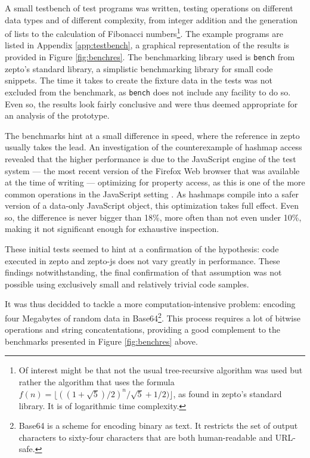 \documentclass[oneside,11pt,xetex]{scrbook}
\begin{document}
A small testbench of test programs was written, testing operations on
different data types and of different complexity, from integer addition and
the generation of lists to the calculation of Fibonacci numbers\footnote{Of interest
might be that not the usual tree-recursive algorithm was used but rather the
algorithm that uses the formula \(f(n) = \lfloor{((1 + \sqrt{5}) / 2)^n / \sqrt{5} + 1/2)}\rfloor\),
as found in zepto's standard library. It is of logarithmic time complexity.}.
The example programs are listed in Appendix \ref{app:testbench}, a graphical
representation of the results is provided in Figure \ref{fig:benchres}. The
benchmarking library used is \texttt{bench} from zepto's standard library,
a simplistic benchmarking library for small code snippets. The time it takes to
create the fixture data in the tests was not excluded from the benchmark, as
\texttt{bench} does not include any facility to do so. Even so, the results look
fairly conclusive and were thus deemed appropriate for an analysis of the
prototype.

The benchmarks hint at a small difference in speed, where the reference
in zepto usually takes the lead. An investigation of the counterexample of
hashmap access revealed that the higher performance is due to the JavaScript
engine of the test system --- the most recent version of the Firefox Web browser
that was available at the time of writing --- optimizing for property access, as
this is one of the more common operations in the JavaScript setting \parencite{JSPA}.
As hashmaps compile into a safer version of a data-only JavaScript object, this
optimization takes full effect. Even so, the difference is never bigger than 18\%,
more often than not even under 10\%, making it not significant enough
for exhaustive inspection.

These initial tests seemed to hint at a confirmation of the hypothesis: code executed
in zepto and zepto-js does not vary greatly in performance. These findings notwithstanding,
the final confirmation of that assumption was not possible using exclusively small and
relatively trivial code samples.

It was thus decidded to tackle a more computation-intensive problem:
encoding four Megabytes of random data in Base64\footnote{Base64 is a scheme
for encoding binary as text. It restricts the set of output characters to
sixty-four characters that are both human-readable and URL-safe.}. This
process requires a lot of bitwise operations and string concatentations,
providing a good complement to the benchmarks presented in Figure
\ref{fig:benchres} above.
\end{document}
